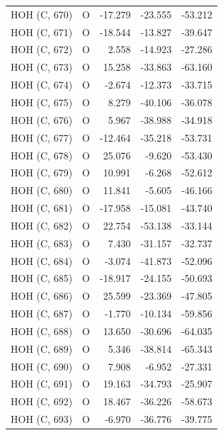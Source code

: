 \begin{longtable}{@{}lcrr@{}}
  \cmidrule(r){1-5}
  HOH (C, 670) & O & -17.279 & -23.555 & -53.212 \\
  \cmidrule(r){1-5}
  HOH (C, 671) & O & -18.544 & -13.827 & -39.647 \\
  \cmidrule(r){1-5}
  HOH (C, 672) & O & 2.558 & -14.923 & -27.286 \\
  \cmidrule(r){1-5}
  HOH (C, 673) & O & 15.258 & -33.863 & -63.160 \\
  \cmidrule(r){1-5}
  HOH (C, 674) & O & -2.674 & -12.373 & -33.715 \\
  \cmidrule(r){1-5}
  HOH (C, 675) & O & 8.279 & -40.106 & -36.078 \\
  \cmidrule(r){1-5}
  HOH (C, 676) & O & 5.967 & -38.988 & -34.918 \\
  \cmidrule(r){1-5}
  HOH (C, 677) & O & -12.464 & -35.218 & -53.731 \\
  \cmidrule(r){1-5}
  HOH (C, 678) & O & 25.076 & -9.620 & -53.430 \\
  \cmidrule(r){1-5}
  HOH (C, 679) & O & 10.991 & -6.268 & -52.612 \\
  \cmidrule(r){1-5}
  HOH (C, 680) & O & 11.841 & -5.605 & -46.166 \\
  \cmidrule(r){1-5}
  HOH (C, 681) & O & -17.958 & -15.081 & -43.740 \\
  \cmidrule(r){1-5}
  HOH (C, 682) & O & 22.754 & -53.138 & -33.144 \\
  \cmidrule(r){1-5}
  HOH (C, 683) & O & 7.430 & -31.157 & -32.737 \\
  \cmidrule(r){1-5}
  HOH (C, 684) & O & -3.074 & -41.873 & -52.096 \\
  \cmidrule(r){1-5}
  HOH (C, 685) & O & -18.917 & -24.155 & -50.693 \\
  \cmidrule(r){1-5}
  HOH (C, 686) & O & 25.599 & -23.369 & -47.805 \\
  \cmidrule(r){1-5}
  HOH (C, 687) & O & -1.770 & -10.134 & -59.856 \\
  \cmidrule(r){1-5}
  HOH (C, 688) & O & 13.650 & -30.696 & -64.035 \\
  \cmidrule(r){1-5}
  HOH (C, 689) & O & 5.346 & -38.814 & -65.343 \\
  \cmidrule(r){1-5}
  HOH (C, 690) & O & 7.908 & -6.952 & -27.331 \\
  \cmidrule(r){1-5}
  HOH (C, 691) & O & 19.163 & -34.793 & -25.907 \\
  \cmidrule(r){1-5}
  HOH (C, 692) & O & 18.467 & -36.226 & -58.673 \\
  \cmidrule(r){1-5}
  HOH (C, 693) & O & -6.970 & -36.776 & -39.775 \\

\end{longtable}
